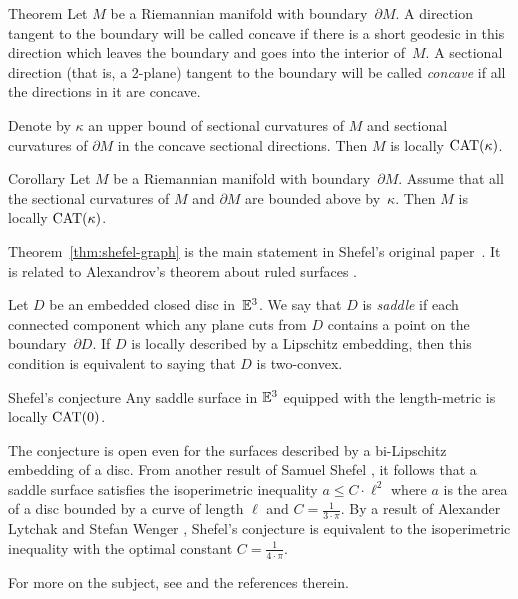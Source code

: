 \begin{thm}{Theorem}
Let $M$ be a Riemannian manifold with boundary~$\partial M$.
A direction tangent to the boundary will be called concave if there is a short geodesic in this direction which leaves the boundary and goes into the interior of~$M$.
A sectional direction (that is, a 2-plane) 
tangent to the boundary 
will be called \emph{concave} if all the directions in it are concave.

Denote by $\kappa$ an upper bound of sectional curvatures of $M$ and  
sectional curvatures of $\partial M$ in the concave sectional directions. 
Then $M$ is locally $\mathrm{CAT}(\kappa)$. 
\end{thm}

\begin{thm}{Corollary}
Let $M$ be a Riemannian manifold with boundary~$\partial M$. 
Assume that all the sectional curvatures of $M$ and $\partial M$ are bounded above by~$\kappa$.
Then $M$ is locally $\mathrm{CAT}(\kappa)$.
\end{thm}

Theorem~\ref{thm:shefel-graph} is the main statement in Shefel's original paper~\cite{shefel-1965}.
It is related to Alexandrov's theorem about ruled surfaces \cite{alexandrov-1957-ruled-surfaces}.

Let $D$ be an embedded closed disc in~$\mathbb{E}^3$.
We say that $D$ is \emph{saddle} if each connected component which any plane cuts from $D$ contains a point on the boundary~$\partial D$.
If $D$ is locally described by a Lipschitz embedding, then 
this condition is equivalent to saying that $D$ is two-convex.

\begin{thm}{Shefel's conjecture}
Any saddle surface in $\mathbb{E}^3$ equipped with the length-metric is locally $\mathrm{CAT}(0)$.
\end{thm} 

The conjecture is open even for the surfaces described by a bi-Lipschitz embedding of a disc.
From another result of Samuel Shefel \cite{shefel-1965}, 
it follows that a saddle surface satisfies the isoperimetric inequality $a\le C\cdot \ell^2$ 
where $a$ is the area of a disc  bounded by a curve of length $\ell$ and $C=\tfrac{1}{3\cdot\pi}$.
By a result of Alexander Lytchak and Stefan Wenger \cite{lytchak-wenger}, Shefel's conjecture is equivalent to the isoperimetric inequality with the optimal constant $C=\tfrac{1}{4\cdot\pi}$.

For more on the subject, see \cite{petrunin-stadler} and the references therein. 
